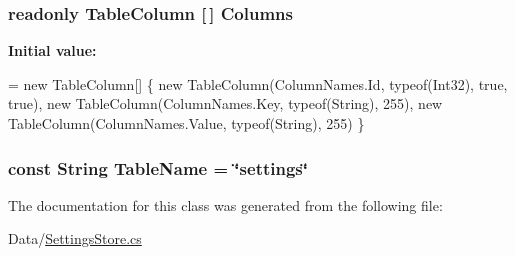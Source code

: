 \subsubsection[{Columns}]{\setlength{\rightskip}{0pt plus 5cm}readonly {\bf Table\+Column} \mbox{[}$\,$\mbox{]} Columns\hspace{0.3cm}{\ttfamily [static]}}\label{classOTA_1_1Data_1_1SettingsStore_1_1SettingsTable_afdedc9f90d9d4e7d2727bf6d101733bf}
{\bfseries Initial value\+:}
\begin{DoxyCode}
= \textcolor{keyword}{new} TableColumn[]
            \{
                \textcolor{keyword}{new} TableColumn(ColumnNames.Id, typeof(Int32), \textcolor{keyword}{true}, \textcolor{keyword}{true}),
                \textcolor{keyword}{new} TableColumn(ColumnNames.Key, typeof(String), 255),
                \textcolor{keyword}{new} TableColumn(ColumnNames.Value, typeof(String), 255)
            \}
\end{DoxyCode}
\hypertarget{classOTA_1_1Data_1_1SettingsStore_1_1SettingsTable_a031b487979d7f51a4d54951b8fedebee}{}
\subsubsection[{Table\+Name}]{\setlength{\rightskip}{0pt plus 5cm}const String Table\+Name = \char`\"{}settings\char`\"{}}\label{classOTA_1_1Data_1_1SettingsStore_1_1SettingsTable_a031b487979d7f51a4d54951b8fedebee}


The documentation for this class was generated from the following file\+:\begin{DoxyCompactItemize}
\item 
Data/\hyperlink{SettingsStore_8cs}{Settings\+Store.\+cs}\end{DoxyCompactItemize}
